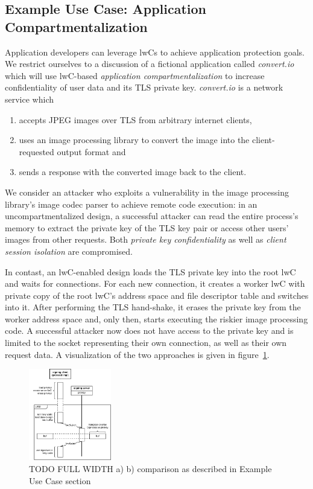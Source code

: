 \documentclass[10pt,twocolumn,letter]{article}
\begin{document}
\subsection{Example Use Case: Application Compartmentalization}\label{design:usage}

Application developers can leverage lwCs to achieve application protection goals.
We restrict ourselves to a discussion of a fictional application called \newcommand\appname{\textit{convert.io}\xspace} \appname which will use lwC-based \textit{application compartmentalization} to increase confidentiality of user data and its TLS private key. 
\appname is a network service which
\begin{enumerate}
  \item accepts JPEG images over TLS from arbitrary internet clients,
  \item uses an image processing library to convert the image into the client-requested output format and
  \item sends a response with the converted image back to the client.
\end{enumerate}

We consider an attacker who exploits a vulnerability in the image processing library's image codec parser to achieve remote code execution:
in an uncompartmentalized design, a successful attacker can read the entire process's memory to extract the private key of the TLS key pair or access other users' images from other requests.
Both \textit{private key confidentiality} as well as \textit{client session isolation} are compromised.

In contast, an lwC-enabled design loads the TLS private key into the root lwC and waits for connections.
For each new connection, it creates a worker lwC with private copy of the root lwC's address space and file descriptor table and switches into it.
After performing the TLS hand-shake, it erases the private key from the worker address space and, only then, starts executing the riskier image processing code.
A successful attacker now does not have access to the private key and is limited to the socket representing their own connection, as well as their own request data.
A visualization of the two approaches is given in figure~\ref{design:usage:apparchpost}.

\begin{figure}
  \label{design:usage:apparchpre}
  \label{design:usage:apparchpost}
  \centering
  \includegraphics[height=4cm]{fig/encryption-compartment}
  \caption{
    TODO FULL WIDTH a)  b) comparison as described in Example Use Case section
  }
\end{figure}
\end{document}
